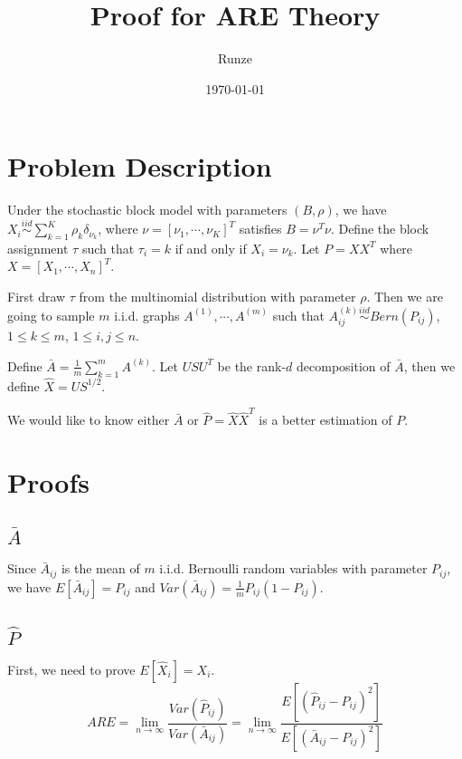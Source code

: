 \documentclass[a4paper]{article}
\title{Proof for ARE Theory}
\author{Runze}
\date{\today}
\begin{document}
\maketitle

\section{Problem Description}

Under the stochastic block model with parameters $(B, \rho)$, we have $X_i \stackrel{iid}{\sim} \sum_{k=1}^K \rho_k \delta_{\nu_k}$, where $\nu = [\nu_1, \cdots, \nu_K]^T$ satisfies $B = \nu^T \nu$. Define the block assignment $\tau$ such that $\tau_i = k$ if and only if $X_i = \nu_k$. Let $P = X X^T$ where $X = [X_1, \cdots, X_n]^T$.

First draw $\tau$ from the multinomial distribution with parameter $\rho$. Then we are going to sample $m$ i.i.d. graphs $A^{(1)}, \cdots, A^{(m)}$ such that $A^{(k)}_{ij} \stackrel{iid}{\sim} Bern(P_{ij})$, $1 \le k \le m$, $1 \le i, j \le n$.

Define $\bar{A} = \frac{1}{m} \sum_{k=1}^m A^{(k)}$. Let $U S U^T$ be the rank-$d$ decomposition of $\bar{A}$, then we define $\hat{X} = U S^{1/2}$.

We would like to know either $\bar{A}$ or $\hat{P} = \hat{X} \hat{X}^T$ is a better estimation of $P$.






\section{Proofs}

\subsection{$\bar{A}$}

Since $\bar{A}_{ij}$ is the mean of $m$ i.i.d. Bernoulli random variables with parameter $P_{ij}$, we have $E[\bar{A}_{ij}] = P_{ij}$ and $Var(\bar{A}_{ij}) = \frac{1}{m} P_{ij} (1-P_{ij})$.



\subsection{$\hat{P}$}

First, we need to prove $E[\hat{X}_i] = X_i$.
\[
	ARE = \lim_{n \rightarrow \infty} \frac{Var(\hat{P}_{ij})}{Var(\bar{A}_{ij})}
    = \lim_{n \rightarrow \infty} \frac{E[(\hat{P}_{ij} - P_{ij})^2]}{E[(\bar{A}_{ij} - P_{ij})^2]}
\]
\end{document}
